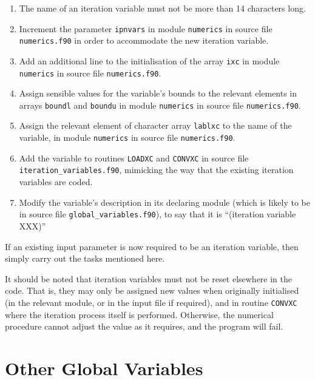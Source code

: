 \documentclass[11pt,a4paper]{report}
\begin{document}
\begin{enumerate}

\item The name of an iteration variable must not be more than 14 characters long.

\item Increment the parameter \texttt{ipnvars} in module \texttt{numerics} in
  source file \texttt{numerics.f90} in order to accommodate the new iteration
  variable.

\item Add an additional line to the initialisation of the array \texttt{ixc}
  in module \texttt{numerics} in source file \texttt{numerics.f90}.

\item Assign sensible values for the variable's bounds to the relevant
  elements in arrays \texttt{boundl} and \texttt{boundu} in module
  \texttt{numerics} in source file \texttt{numerics.f90}.

\item Assign the relevant element of character array \texttt{lablxc} to the
  name of the variable, in module \texttt{numerics} in source file
  \texttt{numerics.f90}.

\item Add the variable to routines \texttt{LOADXC} and \texttt{CONVXC} in
  source file \texttt{iteration\_variables.f90}, mimicking the way that the
  existing iteration variables are coded.

\item Modify the variable's description in its declaring module (which is
  likely to be in source file \texttt{global\_variables.f90}), to say that it
  is ``(iteration variable XXX)''

\end{enumerate}

If an existing input parameter is now required to be an iteration variable,
then simply carry out the tasks mentioned here.

It should be noted that iteration variables must not be reset elsewhere in the
code. That is, they may only be assigned new values when originally
initialised (in the relevant module, or in the input file if required), and in
routine \texttt{CONVXC} where the iteration process itself is performed.
Otherwise, the numerical procedure cannot adjust the value as it requires, and
the program will fail.

\section{Other Global Variables}
\end{document}
